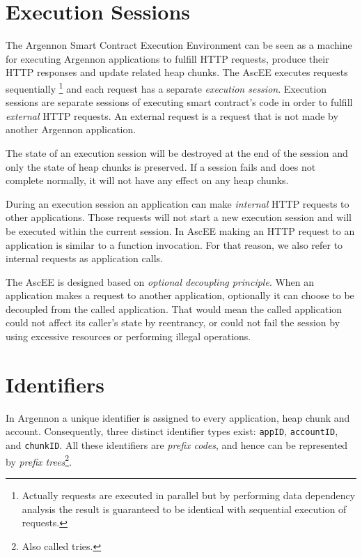 \section{Execution Sessions}\label{sec:sessions}

The Argennon Smart Contract Execution Environment can be seen as a machine for executing Argennon applications to
fulfill HTTP requests, produce their HTTP responses and update related heap chunks. The AscEE executes requests
sequentially \footnote{Actually requests are executed in parallel but by performing data dependency analysis the
result is guaranteed to be identical
with sequential execution of requests.} and each request has a separate \emph{execution session}. Execution sessions
are separate sessions of executing smart contract's code in order to fulfill \emph{external} HTTP requests. An
external request is a request that is not made by another Argennon application.

The state of an execution session will be
destroyed at the end of the session and only the state of heap chunks is preserved. If a session fails and does not
complete normally, it will not have any effect on any heap chunks.

During an execution session an application can make \emph{internal} HTTP requests to other applications. Those
requests will not start a new execution session and will be executed within the current session. In AscEE making an
HTTP request to an application is similar to a function invocation. For that reason, we also refer to internal requests
as application calls.

The AscEE is designed based on \emph{optional decoupling principle}. When an application makes a request to another
application, optionally it can choose to be decoupled from the called application. That would mean the called
application could not affect its caller's state by reentrancy, or could not fail the session by using excessive
resources or performing illegal operations.


\section{Identifiers}\label{sec:identifiers}

In Argennon a unique identifier is assigned to every application, heap chunk and account. Consequently, three distinct
identifier types exist: \texttt{appID}, \texttt{accountID}, and \texttt{chunkID}.
All these identifiers are \emph{prefix codes}, and hence can be represented by
\emph{prefix trees}\footnote{Also called tries.}.

